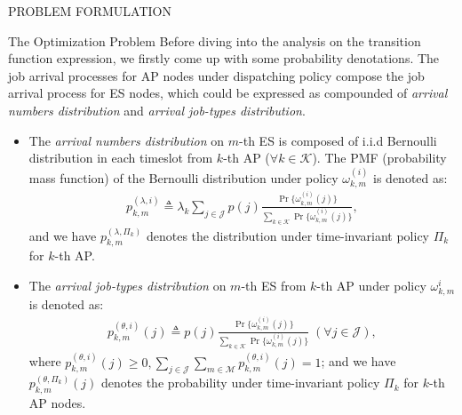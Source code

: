 \documentclass[10pt, conference, letterpaper]{IEEEtran}
\newcommand{\define}{\triangleq}
\renewcommand{\vec}{\mathbf}
\newcommand{\apSet}{\mathcal{K}}
\newcommand{\esSet}{\mathcal{M}}
\newcommand{\jSpace}{\mathcal{J}}
\begin{document}
\begin{section}{PROBLEM FORMULATION}
\begin{subsection}{The Optimization Problem}
            Before diving into the analysis on the transition function expression, we firstly come up with some probability denotations.
            The job arrival processes for AP nodes under dispatching policy compose the job arrival process for ES nodes, which could be expressed as compounded of \emph{arrival numbers distribution} and \emph{arrival job-types distribution}.
            \begin{itemize}
                \item
                    The \emph{arrival numbers distribution} on $m$-th ES is composed of i.i.d Bernoulli distribution in each timeslot from $k$-th AP ($\forall k\in\apSet$). The PMF (probability mass function) of the Bernoulli distribution under policy $\omega^{(i)}_{k,m}$ is denoted as:
                    \begin{align}
                        p^{(\lambda,i)}_{k,m} \define \lambda_k \sum_{j\in\jSpace} p(j)
                            \frac{
                                \Pr\{\omega^{(i)}_{k,m}(j)\}
                            }{
                                \sum_{k\in\apSet} \Pr\{\omega^{(i)}_{k,m}(j)\}
                            },
                    \end{align}
                    and we have $p^{(\lambda,\Pi_k)}_{k,m}$ denotes the distribution under time-invariant policy $\Pi_{k}$ for $k$-th AP.
                \item
                    The \emph{arrival job-types distribution} on $m$-th ES from $k$-th AP under policy $\omega^{i}_{k,m}$ is denoted as:
                    \begin{align}
                        p^{(\theta, i)}_{k,m}(j) \define p(j)
                            \frac{
                                \Pr\{\omega^{(i)}_{k,m}(j)\}
                            }{
                                \sum_{k\in\apSet} \Pr\{\omega^{(i)}_{k,m}(j)\}
                            }\;(\forall j\in\jSpace),
                    \end{align}
                    where $p^{(\theta, i)}_{k,m}(j) \geq 0, \sum_{j\in\jSpace}\sum_{m\in\esSet} p^{(\theta, i)}_{k,m}(j)=1$; and we have $p^{(\theta,\Pi_k)}_{k,m}(j)$ denotes the probability under time-invariant policy $\Pi_k$ for $k$-th AP nodes.
            \end{itemize}
            

\end{subsection}
\end{section}
\end{document}

